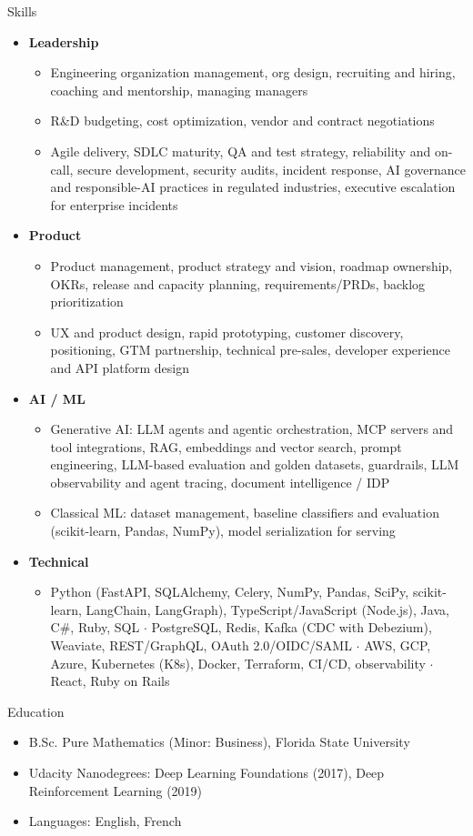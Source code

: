 \documentclass[10pt,oneside]{article}
\newenvironment{ressection}[1]{
  \vspace{4pt}
  {\fontfamily{phv}\selectfont\Large#1}
  \begin{itemize}
    \vspace{3pt}
}{
  \end{itemize}
}
\newcommand{\resitem}[1]{
  \vspace{-4pt}
\item \begin{flushleft} #1 \end{flushleft}
}
\newcommand{\ressubitem}[1]{
  \vspace{-1pt}
\item \begin{flushleft} #1 \end{flushleft}
}
\newenvironment{reslist}[1]{
  \resitem{\textbf{#1}}
  \vspace{-5pt}
  \begin{itemize}
}{
  \end{itemize}
}
\begin{document}
\begin{ressection}{Skills}
  \begin{reslist}{Leadership}
    \ressubitem{Engineering organization management, org design, recruiting and hiring, coaching and mentorship, managing managers}
    \ressubitem{R\&D budgeting, cost optimization, vendor and contract negotiations}
    \ressubitem{Agile delivery, SDLC maturity, QA and test strategy, reliability and on-call, secure development, security audits, incident response, AI governance and responsible-AI practices in regulated industries, executive escalation for enterprise incidents}
  \end{reslist}
  \begin{reslist}{Product}
    \ressubitem{Product management, product strategy and vision, roadmap ownership, OKRs, release and capacity planning, requirements/PRDs, backlog prioritization}
    \ressubitem{UX and product design, rapid prototyping, customer discovery, positioning, GTM partnership, technical pre-sales, developer experience and API platform design}
  \end{reslist}
  \begin{reslist}{AI / ML}
    \ressubitem{Generative AI: LLM agents and agentic orchestration, MCP servers and tool integrations, RAG, embeddings and vector search, prompt engineering, LLM-based evaluation and golden datasets, guardrails, LLM observability and agent tracing, document intelligence / IDP}
    \ressubitem{Classical ML: dataset management, baseline classifiers and evaluation (scikit-learn, Pandas, NumPy), model serialization for serving}
  \end{reslist}
  \begin{reslist}{Technical}
    \ressubitem{Python (FastAPI, SQLAlchemy, Celery, NumPy, Pandas, SciPy, scikit-learn, LangChain, LangGraph), TypeScript/JavaScript (Node.js), Java, C\#, Ruby, SQL $\cdot$ PostgreSQL, Redis, Kafka (CDC with Debezium), Weaviate, REST/GraphQL, OAuth 2.0/OIDC/SAML $\cdot$ AWS, GCP, Azure, Kubernetes (K8s), Docker, Terraform, CI/CD, observability $\cdot$ React, Ruby on Rails}
  \end{reslist}
\end{ressection}

\begin{ressection}{Education}
  \ressubitem{B.Sc. Pure Mathematics (Minor: Business), Florida State University}
  \ressubitem{Udacity Nanodegrees: Deep Learning Foundations (2017), Deep Reinforcement Learning (2019)}
  \ressubitem{Languages: English, French}
\end{ressection}
\end{document}
